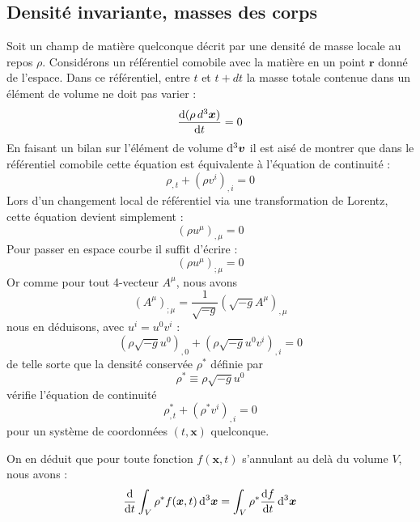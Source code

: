 		\subsection{Densité invariante, masses des corps}

			Soit un champ de matière quelconque décrit par une densité de masse locale au repos $\rho$. Considérons un référentiel comobile avec la matière en un point $\bm{r}$ donné de l'espace. Dans ce référentiel, entre $t$ et $t+dt$ la masse totale contenue dans un élément de volume ne doit pas varier :
			\begin{equation}
				\frac{\mathrm{d}(\rho \, d^3\bm{x})}{\mathrm{d} t} = 0
			\end{equation}
			En faisant un bilan sur l'élément de volume $\mathrm{d}^3\bm{v}$ il est aisé de montrer que dans le référentiel comobile cette équation est équivalente à l'équation de continuité :
			\begin{equation}
				\rho_{,t} + (\rho v^i)_{,i} = 0		
			\end{equation}	
			Lors d'un changement local de référentiel via une transformation de Lorentz, cette équation devient simplement :
			\begin{equation}
				(\rho u^\mu)_{,\mu}=0
			\end{equation}
			Pour passer en espace courbe il suffit d'écrire :
			\begin{equation}
				(\rho u^\mu)_{;\mu}=0
			\end{equation}
			Or comme pour tout 4-vecteur $A^\mu$, nous avons 
			\begin{equation}
				(A^\mu)_{;\mu}=\frac{1}{\sqrt{-g}}(\sqrt{-g}A^\mu)_{,\mu}
			\end{equation}
			nous en déduisons, avec $u^i=u^0v^i$ :
			\begin{equation}
				(\rho\sqrt{-g}u^0)_{,0}+(\rho\sqrt{-g}u^0v^i)_{,i}=0
			\end{equation}
			de telle sorte que la densité conservée $\rho^*$ définie par
			\begin{equation}
				\rho^*\equiv \rho \sqrt{-g}u^0
			\end{equation}
			vérifie l'équation de continuité
			\begin{equation}
				\rho^*_{,t}+(\rho^*v^i)_{,i}=0
			\end{equation}
			pour un système de coordonnées $(t,\bm{x})$ quelconque.

			On en déduit que pour toute fonction $f(\bm{x},t)$ s'annulant au delà du volume $V$, nous avons :
			\begin{equation}
				\frac{\mathrm{d}}{\mathrm{d} t} \int_V \rho^* f(\bm{x},t) \, \mathrm{d}^3\bm{x} = \int_V \rho^* \frac{\mathrm{d} f}{\mathrm{d} t} \,\mathrm{d}^3\bm{x} 
			\end{equation}

